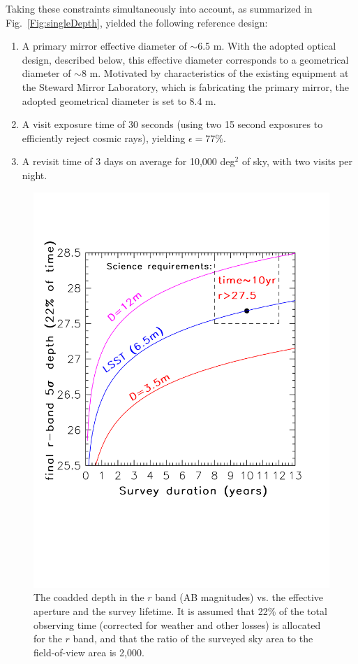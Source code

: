 Taking these constraints simultaneously into account, as summarized in
Fig.~\ref{Fig:singleDepth},
yielded the following reference design:
\begin{enumerate}
\item A primary mirror effective diameter of $\sim$6.5 m. With the adopted optical
design, described below, this effective diameter corresponds to a geometrical diameter
of $\sim$8 m. Motivated by characteristics of the existing equipment at the
Steward Mirror Laboratory, which is fabricating the primary mirror, the adopted
geometrical diameter is set to 8.4 m.
\item A visit exposure time of 30 seconds (using two 15 second exposures
to efficiently reject cosmic rays), yielding $\epsilon=77$\%.
\item A revisit time of 3 days on average for 10,000 deg$^2$ of sky,
  with two visits per night.
\end{enumerate}

\begin{figure}[t]
\vskip -0.5in
\includegraphics[width=1.1\hsize,clip]{coaddedDepth.pdf}
\vskip -1.1in
\caption{The coadded depth in the $r$ band (AB magnitudes) vs. the effective aperture and
the survey lifetime. It is assumed that 22\% of the total observing time (corrected for
weather and other losses) is allocated for the $r$ band, and that the ratio of
the surveyed sky area to the field-of-view area is 2,000.}
\label{Fig:coaddDepth}
\end{figure}

